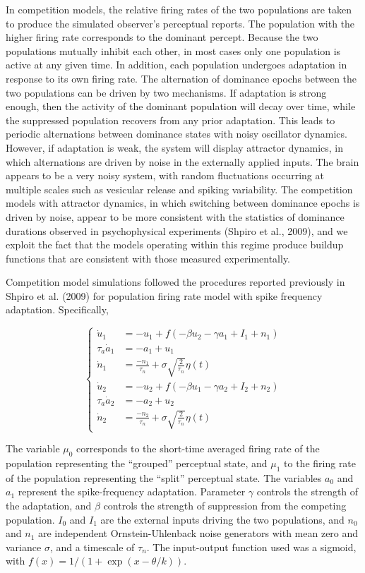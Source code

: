 In competition models, the relative firing rates of the two populations are taken to produce the simulated observer’s perceptual reports. The population with the higher firing rate corresponds to the dominant percept. Because the two populations mutually inhibit each other, in most cases only one population is active at any given time. In addition, each population undergoes adaptation in response to its own firing rate. The alternation of dominance epochs between the two populations can be driven by two mechanisms. If adaptation is strong enough, then the activity of the dominant population will decay over time, while the suppressed population recovers from any prior adaptation. This leads to periodic alternations between dominance states with noisy oscillator dynamics. However, if adaptation is weak, the system will display attractor dynamics, in which alternations are driven by noise in the externally applied inputs. The brain appears to be a very noisy system, with random fluctuations occurring at multiple scales such as vesicular release and spiking variability. The competition models with attractor dynamics, in which switching between dominance epochs is driven by noise, appear to be more consistent with the statistics of dominance durations observed in psychophysical experiments (Shpiro et al., 2009), and we exploit the fact that the models operating within this regime produce buildup functions that are consistent with those measured experimentally.

Competition model simulations followed the procedures reported previously in Shpiro et al. (2009) for population firing rate model with spike frequency adaptation. Specifically,

\begin{equation}
	\begin{cases}
	\dot{u}_1 & = -u_1 +  f(-\beta u_2 - \gamma a_1 + I_1 + n_1) \\
	\tau_a \dot{a}_1 & = -a_1 + u_1\\
	\dot{n}_1 & = \frac{-n_1}{\tau_n} + \sigma \sqrt{\frac{2}{\tau_n}} \eta(t)\\
	\dot{u}_2 & = -u_2 +  f(-\beta u_1 - \gamma a_2 + I_2 + n_2) \\
	\tau_a \dot{a}_2 & = -a_2 + u_2\\
	\dot{n}_2 & = \frac{-n_2}{\tau_n } + \sigma \sqrt{\frac{2}{\tau_n}} \eta(t)
	
	\end{cases}
\end{equation}

The variable $\mu_0$ corresponds to the short-time averaged firing rate of the population representing the “grouped” perceptual state, and $\mu_1$ to the firing rate of the population representing the “split” perceptual state. The variables $a_0$ and $a_1$ represent the spike-frequency adaptation. Parameter $\gamma$ controls the strength of the adaptation, and $\beta$ controls the strength of suppression from the competing population. $I_0$ and $I_1$ are the external inputs driving the two populations, and $n_0$ and $n_1$ are independent Ornstein-Uhlenback noise generators with mean zero and variance $\sigma$, and a timescale of $\tau_n$. The input-output function used was a sigmoid, with $f(x)=1/(1+\exp(x-\theta/k))$.

